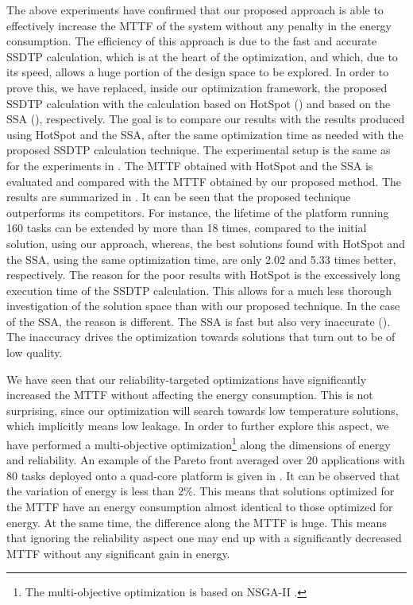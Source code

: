 The above experiments have confirmed that our proposed approach is able to effectively increase the MTTF of the system without any penalty in the energy consumption. The efficiency of this approach is due to the fast and accurate SSDTP calculation, which is at the heart of the optimization, and which, due to its speed, allows a huge portion of the design space to be explored. In order to prove this, we have replaced, inside our optimization framework, the proposed SSDTP calculation with the calculation based on HotSpot () and based on the SSA (), respectively. The goal is to compare our results with the results produced using HotSpot and the SSA, after the same optimization time as needed with the proposed SSDTP calculation technique. The experimental setup is the same as for the experiments in . The MTTF obtained with HotSpot and the SSA is evaluated and compared with the MTTF obtained by our proposed method. The results are summarized in . It can be seen that the proposed technique outperforms its competitors. For instance, the lifetime of the platform running 160 tasks can be extended by more than 18 times, compared to the initial solution, using our approach, whereas, the best solutions found with HotSpot and the SSA, using the same optimization time, are only 2.02 and 5.33 times better, respectively. The reason for the poor results with HotSpot is the excessively long execution time of the SSDTP calculation. This allows for a much less thorough investigation of the solution space than with our proposed technique. In the case of the SSA, the reason is different. The SSA is fast but also very inaccurate (). The inaccuracy drives the optimization towards solutions that turn out to be of low quality.

We have seen that our reliability-targeted optimizations have significantly increased the MTTF without affecting the energy consumption. This is not surprising, since our optimization will search towards low temperature solutions, which implicitly means low leakage. In order to further explore this aspect, we have performed a multi-objective optimization\footnote{The multi-objective optimization is based on NSGA-II \cite{deb2002}.} along the dimensions of energy and reliability. An example of the Pareto front averaged over 20 applications with 80 tasks deployed onto a quad-core platform is given in . It can be observed that the variation of energy is less than 2\%. This means that solutions optimized for the MTTF have an energy consumption almost identical to those optimized for energy. At the same time, the difference along the MTTF is huge. This means that ignoring the reliability aspect one may end up with a significantly decreased MTTF without any significant gain in energy.

